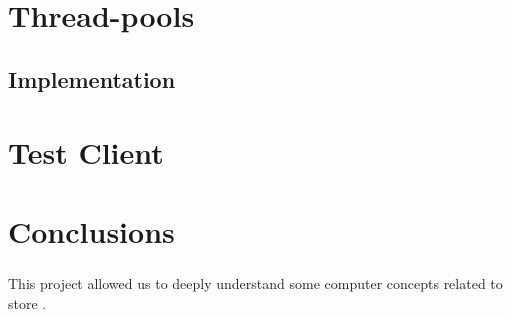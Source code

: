 \documentclass{report}
\begin{document}
	        \paragraph{}
	        
	        \paragraph{}

	\chapter{Thread-pools}
	
	        \paragraph{}
	        
	        \paragraph{}

			\section{Implementation}
	
				\paragraph{}
				
				\paragraph{}

	\chapter{Test Client}
	
	        \paragraph{}
	        
	        \paragraph{}

	\chapter{Conclusions}
	
	        \paragraph{}This project allowed us to deeply understand some computer concepts related to store .
	        
	        \paragraph{}
			
\end{document}
